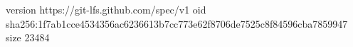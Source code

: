 version https://git-lfs.github.com/spec/v1
oid sha256:1f7ab1cce4534356ac6236613b7cc773e62f8706de7525c8f84596cba7859947
size 23484
